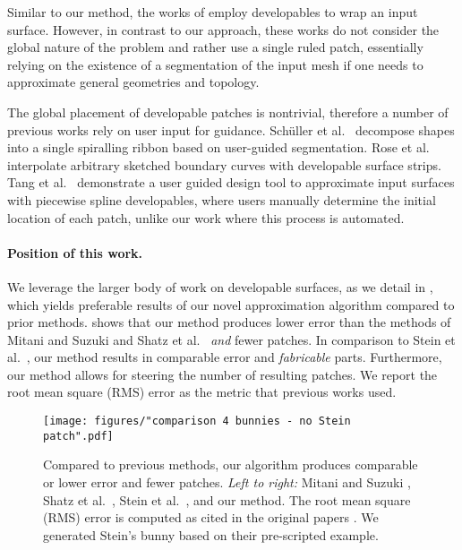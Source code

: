 Similar to our method, the works of \cite{chen_approx,pottmann_approx} employ developables to wrap an input surface. However, in contrast to our approach, these works do not consider the global nature of the problem and rather use a single ruled patch, essentially relying on the existence of a segmentation of the input mesh if one needs to approximate general geometries and topology.

The global placement of developable patches is nontrivial, therefore a number of previous works rely on user input for guidance. Sch\"uller et al.~ decompose shapes into a single spiralling ribbon based on user-guided segmentation. Rose et al.~ interpolate arbitrary sketched boundary curves with developable surface strips. Tang et al.~ demonstrate a user guided design tool to approximate input surfaces with piecewise spline developables, where users manually determine the initial location of each patch, unlike our work where this process is automated.


\paragraph{Position of this work.} 
We leverage the larger body of work on developable surfaces, as we detail in , which yields preferable results of our novel approximation algorithm compared to prior methods.  shows that our method produces lower error than the methods of Mitani and Suzuki  and Shatz et al.~ \emph{and} fewer patches. In comparison to Stein et al.~, our method results in comparable error and \emph{fabricable} parts. Furthermore, our method allows for steering the number of resulting patches. We report the root mean square (RMS) error as the metric that previous works used.  

\begin{figure} [t]
    \centering
    \noindent\texttt{[image: figures/"comparison 4 bunnies - no Stein patch".pdf]}
    \caption{
        Compared to previous methods, our algorithm produces comparable or lower error and fewer patches. \emph{Left to right: }Mitani and Suzuki , Shatz et al.~, Stein et al.~, and our method. The root mean square (RMS) error is computed as cited in the original papers \cite{Cignoni:Metro:1998}. We generated Stein's bunny based on their pre-scripted example. 
        \label{fig:compare_4bunnies}}
\end{figure}